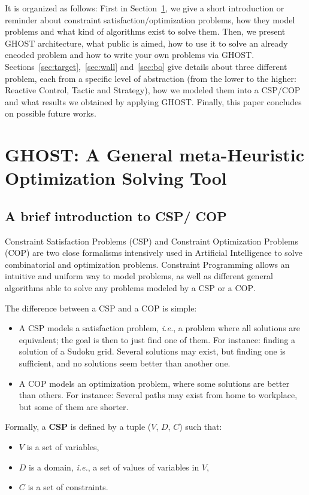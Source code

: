 \documentclass[journal]{IEEEtran}
\newcommand{\csp}{\textsc{CSP}\xspace}
\newcommand{\cop}{\textsc{COP}\xspace}
\newcommand{\ghost}{\textsc{GHOST}\xspace}
\newcommand{\ie}{\textit{i.e.}}
\begin{document}
It is organized as follows:  First in Section~\ref{sec:ghost}, we give
a     short    introduction     or    reminder     about    constraint
satisfaction/optimization problems,  how they model problems  and what
kind  of algorithms  exist to  solve  them.  Then,  we present  \ghost
architecture, what public is aimed, how  to use it to solve an already
encoded   problem   and  how   to   write   your  own   problems   via
\ghost.   Sections~\ref{sec:target},~\ref{sec:wall}   and~\ref{sec:bo}
give details about three different problem, each from a specific level
of abstraction (from the lower to the higher: Reactive Control, Tactic
and Strategy), how  we modeled them into a \csp/\cop  and what results
we  obtained by  applying  \ghost. Finally,  this  paper concludes  on
possible future works.

\section{\ghost:   A  General   meta-Heuristic  Optimization   Solving
  Tool}\label{sec:ghost}
\subsection{A brief introduction to \csp / \cop}

Constraint  Satisfaction Problems  (\csp) and  Constraint Optimization
Problems  (\cop)   are  two  close  formalisms   intensively  used  in
Artificial  Intelligence  to   solve  combinatorial  and  optimization
problems. Constraint  Programming allows an intuitive  and uniform way
to model  problems, as  well as different  general algorithms  able to
solve any problems modeled by a \csp or a \cop.

The difference between a \csp and a \cop is simple:
\begin{itemize}
\item A \csp  models a satisfaction problem, \ie, a  problem where all
  solutions  are equivalent;  the goal  is then  to just  find one  of
  them. For  instance: finding  a solution of  a Sudoku  grid. Several
  solutions may exist, but finding one is sufficient, and no solutions
  seem better than another one.
\item A \cop models an  optimization problem, where some solutions are
  better than others.  For instance: Several paths may exist from home
  to workplace, but some of them are shorter.
\end{itemize}
Formally, a {\bf \csp} is defined by a tuple ($V$, $D$, $C$) such that:
\begin{itemize}
\item $V$ is a set of variables,
\item $D$ is a domain, \ie, a set of values of variables in $V$,
\item $C$ is a set of constraints.
\end{itemize}
\end{document}
